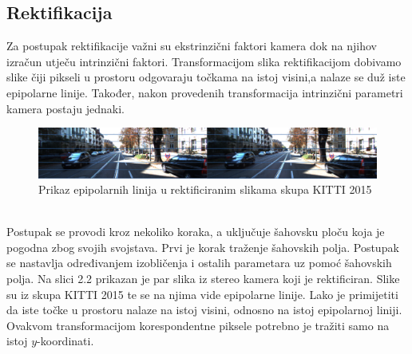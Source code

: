 \documentclass[times, utf8, zavrsni, numeric]{fer}
\begin{document}
\subsection{Rektifikacija}
Za postupak rektifikacije važni su ekstrinzični faktori kamera dok na njihov izračun utječu intrinzični faktori. Transformacijom slika rektifikacijom dobivamo slike čiji pikseli u prostoru odgovaraju točkama na istoj visini,a nalaze se duž iste epipolarne linije. Također, nakon provedenih transformacija intrinzični parametri kamera postaju jednaki.\\
\begin{figure}[htb]
\centering
\includegraphics[width = 14.5cm]{img/slika3.png}
\caption{Prikaz epipolarnih linija u rektificiranim slikama skupa KITTI 2015}
\label{fig:Radial}
\end{figure}\\
Postupak se provodi kroz nekoliko koraka, a uključuje šahovsku ploču koja je pogodna zbog svojih svojstava. Prvi je korak traženje šahovskih polja. Postupak se nastavlja određivanjem izobličenja i ostalih parametara uz pomoć šahovskih polja.
Na slici 2.2 prikazan je par slika iz stereo kamera koji je rektificiran. Slike su iz skupa KITTI 2015 te se na njima vide epipolarne linije. Lako je primijetiti da iste točke u prostoru nalaze na istoj visini, odnosno na istoj epipolarnoj liniji. Ovakvom transformacijom korespondentne piksele potrebno je tražiti samo na istoj $y$-koordinati.
\end{document}
